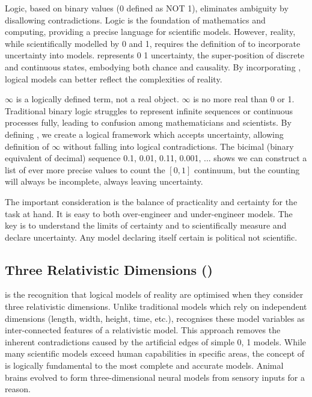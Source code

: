 \documentclass{article}
\begin{document}
Logic, based on binary values (0 defined as NOT 1), eliminates ambiguity by disallowing contradictions. Logic is the foundation of mathematics and computing, providing a precise language for scientific models. However, reality, while scientifically modelled by 0 and 1, requires the definition of \qbit{} to incorporate uncertainty into models. \qbit{} represents 0 1 uncertainty, the super-position of discrete and continuous states, embodying both chance and causality. By incorporating \qbit{}, logical models can better reflect the complexities of reality.

\(\infty\) is a logically defined term, not a real object. \(\infty\) is no more real than 0 or 1. Traditional binary logic struggles to represent infinite sequences or continuous processes fully, leading to confusion among mathematicians and scientists. By defining \qbit{}, we create a logical framework which accepts uncertainty, allowing definition of \(\infty\) without falling into logical contradictions. The bicimal (binary equivalent of decimal) sequence 0.1, 0.01, 0.11, 0.001, ... shows we can construct a list of ever more precise values to count the \([0,1]\) continuum, but the counting will always be incomplete, always leaving \qbit{} uncertainty.

The important consideration is the balance of practicality and certainty for the task at hand. It is easy to both over-engineer and under-engineer models. The key is to understand the limits of certainty and to scientifically measure and declare uncertainty. Any model declaring itself certain is political not scientific.

\subsection*{Three Relativistic Dimensions (\iR{})}

\iR{} is the recognition that logical models of reality are optimised when they consider three relativistic dimensions. Unlike traditional models which rely on independent dimensions (length, width, height, time, etc.), \iR{} recognises these model variables as inter-connected features of a \iR{} relativistic model. This approach removes the inherent contradictions caused by the artificial edges of simple 0, 1 models. While many scientific models exceed human capabilities in specific areas, the concept of \iR{} is logically fundamental to the most complete and accurate models. Animal brains evolved to form three-dimensional neural models from sensory inputs for a reason. 
\end{document}
